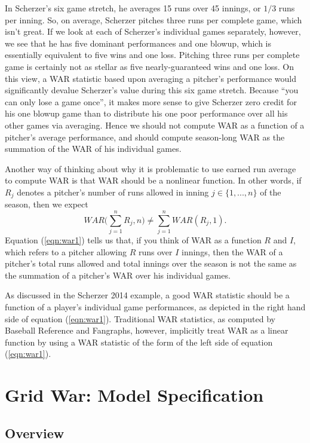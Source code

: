 \documentclass[12pt]{article}
\begin{document}
In Scherzer's six game stretch, he averages 15 runs over 45 innings, or $1/3$ runs per inning. So, on average, Scherzer pitches three runs per complete game, which isn't great. If we look at each of Scherzer's individual games separately, however, we see that he has five dominant performances and one blowup, which is essentially equivalent to five wins and one loss. Pitching three runs per complete game is certainly not as stellar as five nearly-guaranteed wins and one loss. On this view, a WAR statistic based upon averaging a pitcher's performance would significantly devalue Scherzer's value during this six game stretch. Because ``you can only lose a game once'', it makes more sense to give Scherzer zero credit for his one blowup game than to distribute his one poor performance over all his other games via averaging. Hence we should not compute WAR as a function of a pitcher's average performance, and should compute season-long WAR as the summation of the WAR of his individual games. 

Another way of thinking about why it is problematic to use earned run average to compute WAR is that WAR should be a nonlinear function. In other words, if $R_j$ denotes a pitcher's number of runs allowed in inning $j \in \{1,...,n\}$ of the season, then we expect
\begin{equation}
WAR\bigg( \sum_{j=1}^{n} R_j, n \bigg) \neq  \sum_{j=1}^{n} WAR(R_j, 1).
\label{eqn:war1}
\end{equation}
Equation (\ref{eqn:war1}) tells us that, if you think of WAR as a function $R$ and $I$, which refers to a pitcher allowing $R$ runs over $I$ innings, then the WAR of a pitcher's total runs allowed and total innings over the season is not the same as the summation of a pitcher's WAR over his individual games.

As discussed in the Scherzer 2014 example, a good WAR statistic should be a function of a player's individual game performances, as depicted in the right hand side of equation (\ref{eqn:war1}). Traditional WAR statistics, as computed by Baseball Reference and Fangraphs, however, implicitly treat WAR as a linear function by using a WAR statistic of the form of the left side of equation (\ref{eqn:war1}). 




\section{Grid War: Model Specification}

\subsection{Overview}
\end{document}
